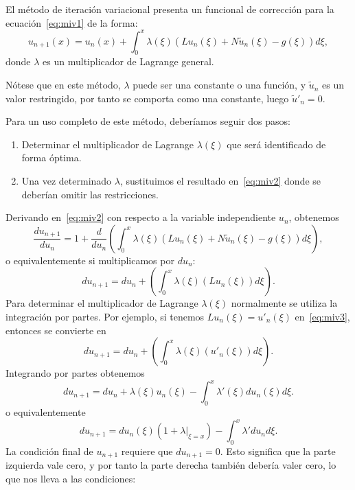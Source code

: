El método de iteración variacional presenta un funcional de corrección para la ecuación~\eqref{eq:miv1} de la forma:
\begin{equation}\label{eq:miv2}
	u_{n+1}(x) = u_n(x) + \int_{0}^{x} \lambda(\xi)(Lu_n(\xi) + N\tilde{u}_n(\xi) - g(\xi))d\xi,
\end{equation}
donde $\lambda$ es un multiplicador de Lagrange general.
\begin{observacion}
	Nótese que en este método, $\lambda$ puede ser una constante o una función, y $\tilde{u}_n$ es un valor restringido, por tanto se comporta como una constante, luego $ \tilde{u}'_n = 0$.
\end{observacion}
Para un uso completo de este método, deberíamos seguir dos pasos:
\begin{enumerate}
	\item Determinar el multiplicador de Lagrange $\lambda(\xi)$ que será identificado de forma óptima.
	\item Una vez determinado $\lambda$, sustituimos el resultado en~\eqref{eq:miv2} donde se deberían omitir las restricciones.
\end{enumerate}
Derivando en~\eqref{eq:miv2} con respecto a la variable independiente $u_n$, obtenemos
\begin{equation}
	\dfrac{d u_{n+1}}{d u_n} = 1 + \dfrac{d}{d u_n}(\int_{0}^{x} \lambda(\xi)(Lu_n(\xi)+N\tilde{u}_n(\xi)-g(\xi))d\xi),
\end{equation}
o equivalentemente si multiplicamos por $du_n$:
\begin{equation}\label{eq:miv3}
	d u_{n+1} = d u_n + (\int_{0}^{x} \lambda (\xi)(Lu_n(\xi))d\xi).
\end{equation}
Para determinar el multiplicador de Lagrange $\lambda(\xi)$ normalmente se utiliza la integración por partes. Por ejemplo, si tenemos $Lu_n(\xi) = u'_n(\xi)$ en~\eqref{eq:miv3}, entonces se convierte en
\begin{equation}
	d u_{n+1} = d u_n +(\int_{0}^{x} \lambda (\xi)(u'_n(\xi))d\xi).
\end{equation}
Integrando por partes obtenemos
\begin{equation}
	d u_{n+1} = d u_n + \lambda(\xi)u_n(\xi) - \int_{0}^{x} \lambda'(\xi) d u_n(\xi)d\xi.
\end{equation}
o equivalentemente
\begin{equation}
	d u_{n+1} = d u_n(\xi)(1 + \lambda |_{\xi = x}) - \int_{0}^{x} \lambda'd u_nd\xi.
\end{equation}
La condición final de $u_{n+1}$ requiere que $d u_{n+1} = 0$. Esto significa que la parte izquierda vale cero, y por tanto la parte derecha también debería valer cero, lo que nos lleva a las condiciones:
